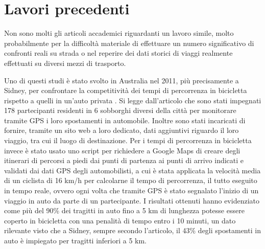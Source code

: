 \section{Lavori precedenti}

Non sono molti gli articoli accademici riguardanti un lavoro simile, molto probabilmente per la difficoltà materiale di effettuare un numero significativo di confronti reali su strada o nel reperire dei dati storici di viaggi realmente effettuati su diversi mezzi di trasporto.

Uno di questi studi è stato svolto in Australia nel 2011, più precisamente a Sidney, per confrontare la competitività dei tempi di percorrenza in bicicletta rispetto a quelli in un'auto privata \cite{ellison2011travel}. Si legge dall'articolo che sono stati impegnati 178 partecipanti residenti in 6 sobborghi diversi della città per monitorare tramite GPS i loro spostamenti in automobile. Inoltre sono stati incaricati di fornire, tramite un sito web a loro dedicato, dati aggiuntivi riguardo il loro viaggio, tra cui il luogo di destinazione. Per i tempi di percorrenza in bicicletta invece è stato usato uno script per richiedere a Google Maps di creare degli itinerari di percorsi a piedi dai punti di partenza ai punti di arrivo indicati e validati dai dati GPS degli automobilisti, a cui è stata applicata la velocità media di un ciclista di 16 km/h per calcolarne il tempo di percorrenza, il tutto eseguito in tempo reale, ovvero ogni volta che tramite GPS è stato segnalato l'inizio di un viaggio in auto da parte di un partecipante. I risultati ottenuti hanno evidenziato come più del 90\% dei tragitti in auto fino a 5 km di lunghezza potesse essere coperto in bicicletta con una penalità di tempo entro i 10 minuti, un dato rilevante visto che a Sidney, sempre secondo l'articolo, il 43\% degli spostamenti in auto è impiegato per tragitti inferiori a 5 km.

